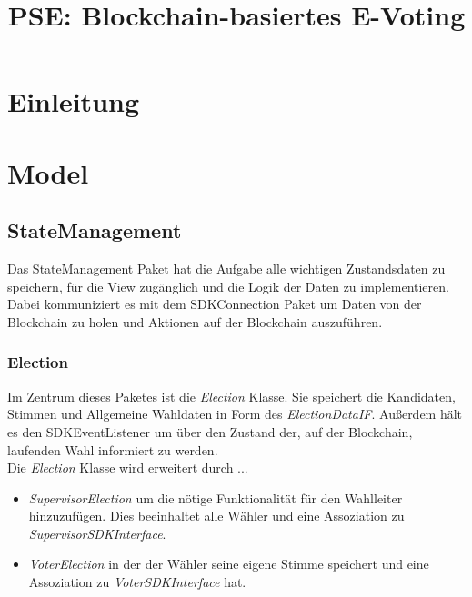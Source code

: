 \documentclass[parskip=full]{scrartcl}
\title{PSE: Blockchain-basiertes E-Voting}
\begin{document}
	\clearpage
	\maketitle
	\newpage
	
	\tableofcontents
	\newpage
	\section{Einleitung}
	
	\section{Model}
	\subsection{StateManagement}
	Das StateManagement Paket hat die Aufgabe alle wichtigen Zustandsdaten zu speichern, für die View zugänglich und die Logik der Daten zu implementieren.
	Dabei kommuniziert es mit dem SDKConnection Paket um Daten von der Blockchain zu holen und Aktionen auf der Blockchain auszuführen.
	
	\subsubsection{Election}
	Im Zentrum dieses Paketes ist die \textit{Election} Klasse. Sie speichert die Kandidaten, Stimmen und Allgemeine Wahldaten in Form des \textit{ElectionDataIF}. Außerdem hält es den SDKEventListener um über den Zustand der, auf 
	der Blockchain, laufenden Wahl informiert zu werden.\\
	Die \textit{Election} Klasse wird erweitert durch ...
	\begin{itemize}
	\item\textit{SupervisorElection} um die nötige Funktionalität für den Wahlleiter hinzuzufügen. Dies beeinhaltet alle Wähler und eine Assoziation zu \textit{SupervisorSDKInterface}.
	\item\textit{VoterElection} in der der Wähler seine eigene Stimme speichert und eine Assoziation zu \textit{VoterSDKInterface} hat.
	\end{itemize}
	
\end{document}
